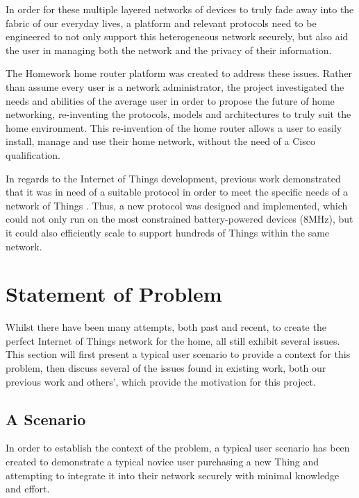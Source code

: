 \documentclass{mprop}
\begin{document}
In order for these multiple layered networks of devices to truly fade away into the fabric of our everyday lives, a platform and relevant protocols need to be engineered to not only support this heterogeneous network securely, but also aid the user in managing both the network and the privacy of their information.

The Homework home router platform\cite{HomeworkControl} was created to address these issues. Rather than assume every user is a network administrator, the project investigated the needs and abilities of the average user in order to propose the future of home networking, re-inventing the protocols, models and architectures to truly suit the home environment. This re-invention of the home router allows a user to easily install, manage and use their home network, without the need of a Cisco qualification.

In regards to the Internet of Things development, previous work demonstrated that it was in need of a suitable protocol in order to meet the specific needs of a network of Things \cite{KNoT}. Thus, a new protocol was designed and implemented, which could not only run on the most constrained battery-powered devices (8MHz), but it could also efficiently scale to support hundreds of Things within the same network.




\section{Statement of Problem}
\label{sec:statement_of_problem}
Whilst there have been many attempts, both past and recent, to create the perfect Internet of Things network for the home, all still exhibit several issues. This section will first present a typical user scenario to provide a context for this problem, then discuss several of the issues found in existing work, both our previous work and others', which provide the motivation for this project.

\subsection{A Scenario} %
\label{sub:scenario}
In order to establish the context of the problem, a typical user scenario has been created to demonstrate a typical novice user purchasing a new Thing and attempting to integrate it into their network securely with minimal knowledge and effort.
\end{document}
